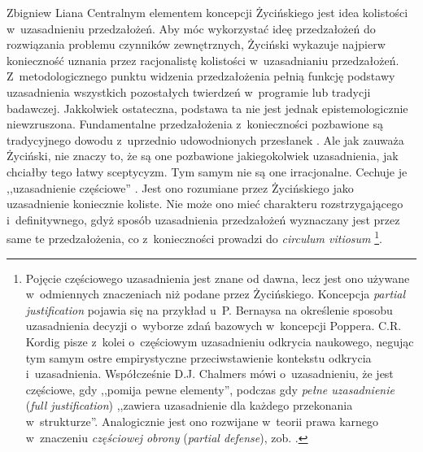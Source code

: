 \begin{artplenv}{Zbigniew Liana}
Centralnym elementem koncepcji Życińskiego jest idea kolistości w~uzasadnieniu przedzałożeń. Aby móc wykorzystać ideę przedzałożeń do rozwiązania problemu czynników zewnętrznych, Życiński wykazuje najpierw konieczność uznania przez racjonalistę kolistości w~uzasadnianiu przedzałożeń. Z~metodologicznego punktu widzenia przedzałożenia pełnią funkcję podstawy uzasadnienia wszystkich pozostałych twierdzeń w~programie lub tradycji badawczej. Jakkolwiek ostateczna, podstawa ta nie jest jednak epistemologicznie niewzruszona. Fundamentalne przedzałożenia z~konieczności pozbawione są tradycyjnego dowodu z~uprzednio udowodnionych przesłanek
\parencite[][przypis 1]{zycinski_teizm_1985}. %
 Ale jak zauważa Życiński, nie znaczy to, że są one pozbawione jakiegokolwiek uzasadnienia, jak chciałby tego łatwy sceptycyzm. Tym samym nie są one irracjonalne. Cechuje je ,,uzasadnienie częściowe'' 
\parencite[][s.~7.156.161.169]{zycinski_teizm_1985}. %
 Jest ono rozumiane przez Życińskiego jako uzasadnienie koniecznie koliste. Nie może ono mieć charakteru rozstrzygającego i~definitywnego, gdyż sposób uzasadnienia przedzałożeń wyznaczany jest przez same te przedzałożenia, co z~konieczności prowadzi do \textit{circulum vitiosum} 
\parencite[][s.~173 oraz 129.141.164]{zycinski_teizm_1985}%
\footnote{Pojęcie częściowego uzasadnienia jest znane od dawna, lecz jest ono używane w~odmiennych znaczeniach niż podane przez Życińskiego. Koncepcja \textit{partial justification} pojawia się na przykład u~P. Bernaysa 
\parencite*[][s.~38]{bernays_reflections_1964} %
 na określenie sposobu uzasadnienia decyzji o~wyborze zdań bazowych w~koncepcji Poppera. C.R. Kordig 
\parencite*[][s.~112]{kordig_discovery_1978} %
 pisze z~kolei o~częściowym uzasadnieniu odkrycia naukowego, negując tym samym ostre empirystyczne przeciwstawienie kontekstu odkrycia i~uzasadnienia. Współcześnie D.J. Chalmers 
\parencite*[][s.~96]{chalmers_constructing_2012} %
 mówi o~uzasadnieniu, że jest częściowe, gdy ,,pomija pewne elementy'', podczas gdy \textit{pełne uzasadnienie} (\textit{full justification}) ,,zawiera uzasadnienie dla każdego przekonania w~strukturze''. Analogicznie jest ono rozwijane w~teorii prawa karnego w~znaczeniu \textit{częściowej obrony} (\textit{partial defense}), zob. 
\parencite[][]{eldar_misguided_2014}.%
}.


\end{artplenv}
